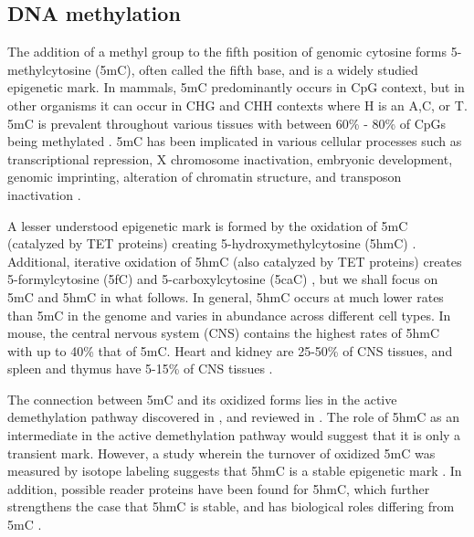 \subsection{DNA methylation}

The addition of a methyl group to the fifth position of genomic cytosine forms 5-methylcytosine (5mC), often called the fifth base, and is a widely studied epigenetic mark. In mammals, 5mC predominantly occurs in CpG context, but in other organisms it can occur in CHG and CHH contexts where H is an A,C, or T. 5mC is prevalent throughout various tissues with between 60\% - 80\% of CpGs being methylated \cite{Smith:2013cd}. 5mC has been implicated in various cellular processes such as transcriptional repression, X chromosome inactivation, embryonic development, genomic imprinting, alteration of chromatin structure, and transposon inactivation \cite{Yong:2016jw}.

A lesser understood epigenetic mark is formed by the oxidation of 5mC (catalyzed by TET proteins) creating 5-hydroxymethylcytosine (5hmC) \cite{Kriaucionis:2009bm, Tahiliani:2009kl}. Additional, iterative oxidation of 5hmC (also catalyzed by TET proteins) creates 5-formylcytosine (5fC) and 5-carboxylcytosine (5caC) \cite{He:2011hc, Ito:2011bv}, but we shall focus on 5mC and 5hmC in what follows. In general, 5hmC occurs at much lower rates than 5mC in the genome and varies in abundance across different cell types. In mouse, the central nervous system (CNS) contains the highest rates of 5hmC with up to 40\% that of 5mC. Heart and kidney are 25-50\% of CNS tissues, and spleen and thymus have 5-15\% of CNS tissues \cite{Wu:2017hu}.

The connection between 5mC and its oxidized forms lies in the active demethylation pathway discovered in \cite{Kriaucionis:2009bm, Tahiliani:2009kl}, and reviewed in \cite{Wu:2017hu}. The role of 5hmC as an intermediate in the active demethylation pathway would suggest that it is only a transient mark. However, a study wherein the turnover of oxidized 5mC was measured by isotope labeling suggests that 5hmC is a stable epigenetic mark \cite{Bachman:2014dla}. In addition, possible reader proteins have been found for 5hmC, which further strengthens the case that 5hmC is stable, and has biological roles differing from 5mC \cite{Spruijt:2013ep}.

